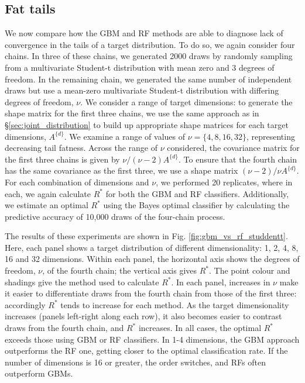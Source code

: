 \documentclass[ba]{imsart}
\numberwithin{equation}{section}
\theoremstyle{plain}
\begin{document}
\begin{supplement}
		\subsection{Fat tails}\label{sec:tail_fatness}
		We now compare how the GBM and RF methods are able to diagnose lack of convergence in the tails of a target distribution. To do so, we again consider four chains. In three of these chains, we generated 2000 draws by randomly sampling from a multivariate Student-t distribution with mean zero and 3 degrees of freedom. In the remaining chain, we generated the same number of independent draws but use a mean-zero multivariate Student-t distribution with differing degrees of freedom, $\nu$. We consider a range of target dimensions: to generate the shape matrix for the first three chains, we use the same approach as in \S\ref{sec:joint_distribution} to build up appropriate shape matrices for each target dimensions, $A^{\{d\}}$. We examine a range of values of $\nu=\{4, 8, 16, 32\}$, representing decreasing tail fatness. Across the range of $\nu$ considered, the covariance matrix for the first three chains is given by $\nu/{(\nu-2)} A^{\{d\}}$. To ensure that the fourth chain has the same covariance as the first three, we use a shape matrix ${(\nu-2)}/\nu A^{\{d\}}$. For each combination of dimensions and $\nu$, we performed 20 replicates, where in each, we again calculate $R^*$ for both the GBM and RF classifiers. Additionally, we estimate an optimal $R^*$ using the Bayes optimal classifier by calculating the predictive accuracy of 10,000 draws of the four-chain process.
		
		The results of these experiments are shown in Fig. \ref{fig:gbm_vs_rf_studdentt}. Here, each panel shows a target distribution of different dimensionality: 1, 2, 4, 8, 16 and 32 dimensions. Within each panel, the horizontal axis shows the degrees of freedom, $\nu$, of the fourth chain; the vertical axis gives $R^*$. The point colour and shadings give the method used to calculate $R^*$. In each panel, increases in $\nu$ make it easier to differentiate draws from the fourth chain from those of the first three: accordingly $R^*$ tends to increase for each method. As the target dimensionality increases (panels left-right along each row), it also becomes easier to contrast draws from the fourth chain, and $R^*$ increases. In all cases, the optimal $R^*$ exceeds those using GBM or RF classifiers. In 1-4 dimensions, the GBM approach outperforms the RF one, getting closer to the optimal classification rate. If the number of dimensions is 16 or greater, the order switches, and RFs often outperform GBMs.
		

\end{supplement}
\end{document}
